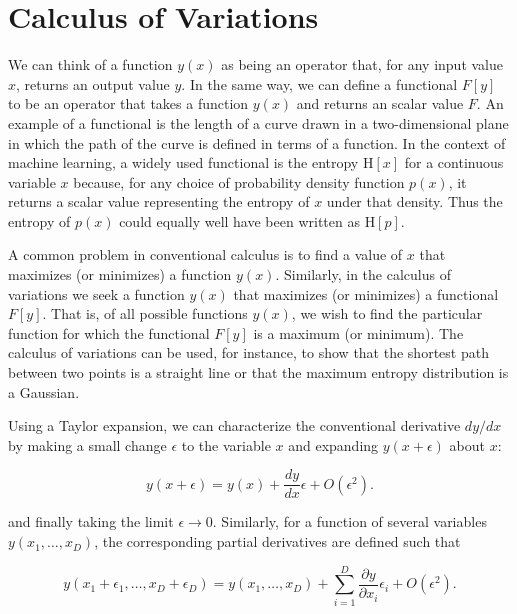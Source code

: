 \documentclass[10pt,twocolumn]{memoir}
\begin{document}
\appendix

\chapter{Calculus of Variations}
\label{app:calculus_of_variations}

We can think of a function $y(x)$ as being an operator that, for any input value $x$, returns an output value $y$. In the same way, we can define a functional $F[y]$ to be an operator that takes a function $y(x)$ and returns an scalar value $F$. An example of a functional is the length of a curve drawn in a two-dimensional plane in which the path of the curve is defined in terms of a function. In the context of machine learning, a widely used functional is the entropy $\mathrm{H}[x]$ for a continuous variable $x$ because, for any choice of probability density function $p(x)$, it returns a scalar value representing the entropy of $x$ under that density. Thus the entropy of $p(x)$ could equally well have been written as $\mathrm{H}[p]$.

A common problem in conventional calculus is to find a value of $x$ that maximizes (or minimizes) a function $y(x)$. Similarly, in the calculus of variations we seek a function $y(x)$ that maximizes (or minimizes) a functional $F[y]$. That is, of all possible functions $y(x)$, we wish to find the particular function for which the functional $F[y]$ is a maximum (or minimum). The calculus of variations can be used, for instance, to show that the shortest path between two points is a straight line or that the maximum entropy distribution is a Gaussian.

Using a Taylor expansion, we can characterize the conventional derivative $dy/dx$ by making a small change $\epsilon$ to the variable $x$ and expanding $y(x+\epsilon)$ about $x$:

\begin{equation}
    y(x+\epsilon) = y(x) + \frac{dy}{dx}\epsilon + O(\epsilon^2).
\label{eq:a4_single_variable_derivative}
\end{equation}

and finally taking the limit $\epsilon \to 0$. Similarly, for a function of several variables $y(x_1,\ldots,x_D)$, the corresponding partial derivatives are defined such that

\begin{equation}
    y(x_1+\epsilon_1,\ldots,x_D+\epsilon_D) = y(x_1,\ldots,x_D) + \sum_{i=1}^{D}\frac{\partial y}{\partial x_i}\epsilon_i + O(\epsilon^2).
\label{eq:a4_multivariate_derivative}
\end{equation}
\end{document}
